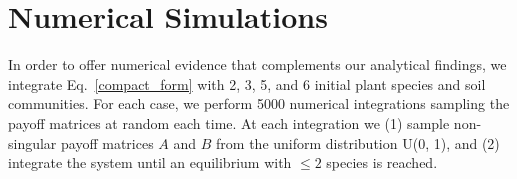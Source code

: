 \documentclass[11pt]{article}
\begin{document}
\section{Numerical Simulations}
In order to offer numerical evidence that complements our analytical findings, we  integrate  Eq.~\ref{compact_form} with 2, 3, 5, and 6 initial plant species and soil communities. For each case, we perform 5000 numerical integrations sampling the payoff matrices at random each time. At each integration we (1) sample non-singular payoff matrices $ A $ and $ B $ from the uniform distribution U(0, 1), and (2) integrate the system until an equilibrium with $\leq 2$ species is reached.



\end{document}
